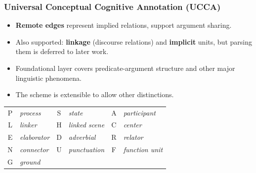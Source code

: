 \documentclass[t]{beamer}
\begin{document}
\begin{frame}
\frametitle{Universal Conceptual Cognitive Annotation (UCCA)}
\begin{itemize}
 \item \textbf{Remote edges} represent implied relations, support argument sharing.
 \item Also supported: \textbf{linkage} (discourse relations) and \textbf{implicit} units,
 but parsing them is deferred to later work.
 \item Foundational layer covers predicate-argument structure and other major linguistic phenomena.
 \item The scheme is extensible to allow other distinctions.
\end{itemize}

\vfill
\begin{center}
  \begin{adjustbox}{margin=2mm,frame}
  \begin{tabular}{c>{\small\it}l|c>{\small\it}l|c>{\small\it}l}
	  P & process &
	  S & state &
	  A & participant \\
	  L & linker &
	  H & linked scene &
	  C & center \\
	  E & elaborator &
	  D & adverbial &
	  R & relator \\
	  N & connector &
	  U & punctuation &
	  F & function unit \\
	  G & ground
  \end{tabular}
  \end{adjustbox}
\end{center}
\end{frame}
\end{document}
